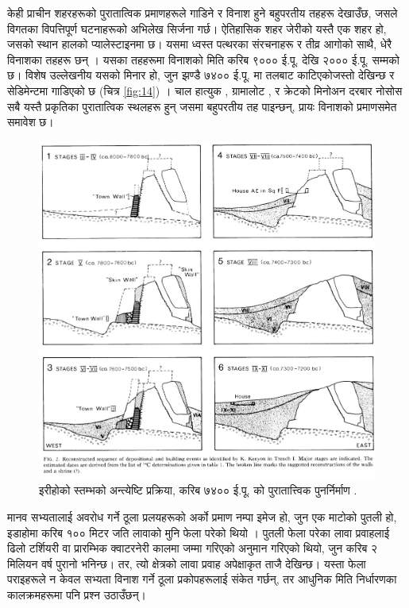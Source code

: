 \documentclass[10pt,twocolumn,letterpaper]{article}
\begin{document}
केही प्राचीन शहरहरूको पुरातात्विक प्रमाणहरूले गाडिने र विनाश हुने बहुपरतीय तहहरू देखाउँछ, जसले विगतका विपत्तिपूर्ण घटनाहरूको अभिलेख सिर्जना गर्छ। ऐतिहासिक शहर जेरीको यस्तै एक शहर हो, जसको स्थान हालको प्यालेस्टाइनमा छ। यसमा ध्वस्त पत्थरका संरचनाहरू र तीव्र आगोको साथै, धेरै विनाशका तहहरू छन् \cite{96,97}। यसका तहहरूमा विनाशको मिति करिब ९००० ई.पू. देखि २००० ई.पू. सम्मको छ। विशेष उल्लेखनीय यसको मिनार हो, जुन झण्डै ७४०० ई.पू. मा तलबाट काटिएकोजस्तो देखिन्छ र सेडिमेन्टमा गाडिएको छ (चित्र \ref{fig:14}) \cite{95}। चाल हात्युक \cite{99}, ग्रामालोट \cite{98}, र क्रेटको मिनोअन दरबार नोसोस \cite{100,101} सबै यस्तै प्रकृतिका पुरातात्विक स्थलहरू हुन् जसमा बहुपरतीय तह पाइन्छन्, प्रायः विनाशको प्रमाणसमेत समावेश छ।

\begin{figure}[t]
\begin{center}

\includegraphics[width=1\linewidth]{jericho.jpg}
\end{center}
   \caption{इरीहोको स्तम्भको अन्त्येष्टि प्रक्रिया, करिब ७४०० ई.पू. को पुरातात्त्विक पुनर्निर्माण \cite{95}.}
\label{fig:14}
\label{fig:onecol}
\end{figure}

मानव सभ्यतालाई अवरोध गर्ने ठूला प्रलयहरूको अर्को प्रमाण नम्पा इमेज हो, जुन एक माटोको पुतली हो, इडाहोमा करिब १०० मिटर जति लावाको मुनि फेला परेको थियो \cite{102,103}। पुतली फेला परेका लावा प्रवाहलाई ढिलो टर्शियरी वा प्रारम्भिक क्वाटरनेरी कालमा जम्मा गरिएको अनुमान गरिएको थियो, जुन करिब २ मिलियन वर्ष पुरानो भनिन्छ। तर, त्यो क्षेत्रको लावा प्रवाह अपेक्षाकृत ताजै देखिन्छ। यस्ता फेला पराइहरूले न केवल सभ्यता विनाश गर्ने ठूला प्रकोपहरूलाई संकेत गर्छन्, तर आधुनिक मिति निर्धारणका कालक्रमहरूमा पनि प्रश्न उठाउँछन्।
\end{document}
